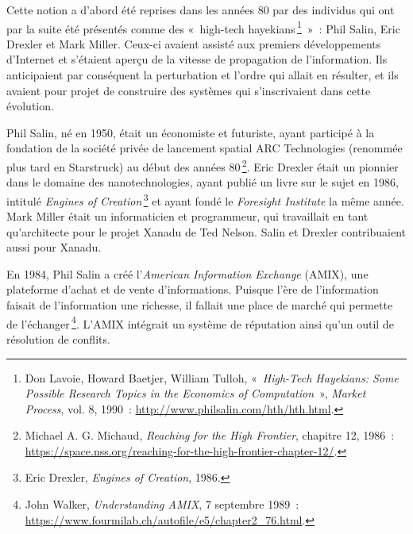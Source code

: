 \documentclass[a4paper,notitlepage]{article}
\newcommand{\eng}[1]{{\NoAutoSpaceBeforeFDP\emph{#1}}}  %
\newcommand{\sfootnote}{\,\footnote}
\begin{document}
Cette notion a d'abord été reprises dans les années 80 par des individus qui ont par la suite été présentés comme des «~high-tech hayekians\sfootnote{Don Lavoie, Howard Baetjer, William Tulloh, «~\eng{High-Tech Hayekians: Some Possible Research Topics in the Economics of Computation}~», \eng{Market Process}, vol. 8, 1990~: \url{http://www.philsalin.com/hth/hth.html}.}~»~: Phil Salin, Eric Drexler et Mark Miller. Ceux-ci avaient assisté aux premiers développements d'Internet et s'étaient aperçu de la vitesse de propagation de l'information. Ils anticipaient par conséquent la perturbation et l'ordre qui allait en résulter, et ils avaient pour projet de construire des systèmes qui s'inscrivaient dans cette évolution. %

Phil Salin, né en 1950, était un économiste et futuriste, ayant participé à la fondation de la société privée de lancement spatial ARC Technologies (renommée plus tard en Starstruck) au début des années 80\sfootnote{Michael A. G. Michaud, \eng{Reaching for the High Frontier}, chapitre 12, 1986~: \url{https://space.nss.org/reaching-for-the-high-frontier-chapter-12/}.}. Eric Drexler était un pionnier dans le domaine des nanotechnologies, ayant publié un livre sur le sujet en 1986, intitulé \eng{Engines of Creation}\sfootnote{Eric Drexler, \eng{Engines of Creation}, 1986.} et ayant fondé le \eng{Foresight Institute} la même année. Mark Miller était un informaticien et programmeur, qui travaillait en tant qu'architecte pour le projet Xanadu de Ted Nelson. Salin et Drexler contribuaient aussi pour Xanadu. %

En 1984, Phil Salin a créé l'\eng{American Information Exchange} (AMIX), une plateforme d'achat et de vente d'informations. Puisque l'ère de l'information faisait de l'information une richesse, il fallait une place de marché qui permette de l'échanger\sfootnote{John Walker, \eng{Understanding AMIX}, 7 septembre 1989~: \url{https://www.fourmilab.ch/autofile/e5/chapter2_76.html}.}. L'AMIX intégrait un système de réputation ainsi qu'un outil de résolution de conflits.

\end{document}
